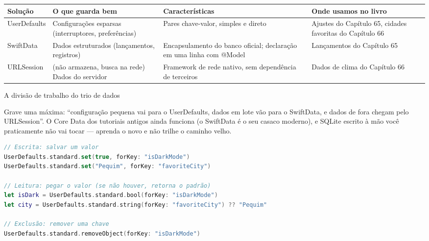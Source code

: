 


\begin{center}
\begin{tabularx}{\linewidth}{|X|X|X|X|}
\hline
\textbf{Solução} & \textbf{O que guarda bem} & \textbf{Características} & \textbf{Onde usamos no livro} \tabularnewline
\hline
UserDefaults & Configurações esparsas (interruptores, preferências) & Pares chave-valor, simples e direto & Ajustes do Capítulo 65, cidades favoritas do Capítulo 66 \tabularnewline
SwiftData & Dados estruturados (lançamentos, registros) & Encapsulamento do banco oficial; declaração em uma linha com @Model & Lançamentos do Capítulo 65 \tabularnewline
URLSession & (não armazena, busca na rede) Dados do servidor & Framework de rede nativo, sem dependência de terceiros & Dados de clima do Capítulo 66 \tabularnewline
\hline
\end{tabularx}
\end{center}

\begin{center}\small\color{gray}A divisão de trabalho do trio de dados\end{center}

Grave uma máxima: “configuração pequena vai para o UserDefaults, dados em lote vão para o SwiftData, e dados de fora chegam pelo URLSession”. O Core Data dos tutoriais antigos ainda funciona (o SwiftData é o seu casaco moderno), e SQLite escrito à mão você praticamente não vai tocar — aprenda o novo e não trilhe o caminho velho.


\begin{lstlisting}[language=Swift]
// Escrita: salvar um valor
UserDefaults.standard.set(true, forKey: "isDarkMode")
UserDefaults.standard.set("Pequim", forKey: "favoriteCity")

// Leitura: pegar o valor (se não houver, retorna o padrão)
let isDark = UserDefaults.standard.bool(forKey: "isDarkMode")
let city = UserDefaults.standard.string(forKey: "favoriteCity") ?? "Pequim"

// Exclusão: remover uma chave
UserDefaults.standard.removeObject(forKey: "isDarkMode")
\end{lstlisting}


